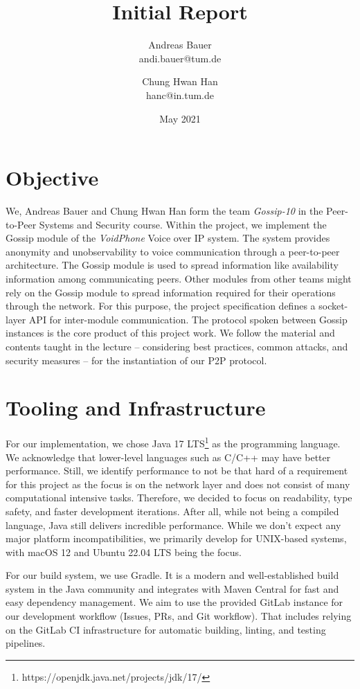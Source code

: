 \documentclass[a4paper, 11pt]{article}
\title{Initial Report}
\author{
    Andreas Bauer\\
    andi.bauer@tum.de
  \and
    Chung Hwan Han\\
    hanc@in.tum.de
}
\date{May 2021}
\begin{document}
    \maketitle

    \section{Objective}\label{sec:objective}

    We, Andreas Bauer and Chung Hwan Han form the team \textit{Gossip-10} in the Peer-to-Peer Systems and Security course.
    Within the project, we implement the Gossip module of the \textit{VoidPhone} Voice over IP system.
    The system provides anonymity and unobservability to voice communication through a peer-to-peer architecture.
    The Gossip module is used to spread information like availability information among communicating peers.
    Other modules from other teams might rely on the Gossip module to spread information required for their operations
    through the network.
    For this purpose, the project specification defines a socket-layer API for inter-module communication.
    The protocol spoken between Gossip instances is the core product of this project work.
    We follow the material and contents taught in the lecture -- considering best practices, common attacks, and security measures --
    for the instantiation of our P2P protocol.

    \section{Tooling and Infrastructure}\label{sec:tooling-and-infrastructure}
    For our implementation, we chose Java 17 LTS\footnote{https://openjdk.java.net/projects/jdk/17/} as the programming language.
    We acknowledge that lower-level languages such as C/C++ may have better performance.
    Still, we identify performance to not be that hard of a requirement for this project
    as the focus is on the network layer and does not consist of many computational intensive tasks.
    Therefore, we decided to focus on readability, type safety, and faster development iterations.
    After all, while not being a compiled language, Java still delivers incredible performance.
    While we don't expect any major platform incompatibilities, we primarily develop for UNIX-based systems, with macOS 12 and Ubuntu 22.04 LTS being the focus.

    For our build system, we use Gradle.
    It is a modern and well-established build system in the Java community and integrates with Maven Central for fast and easy dependency management.
    We aim to use the provided GitLab instance for our development workflow (Issues, PRs, and Git workflow).
    That includes relying on the GitLab CI infrastructure for automatic building, linting, and testing pipelines.
\end{document}
